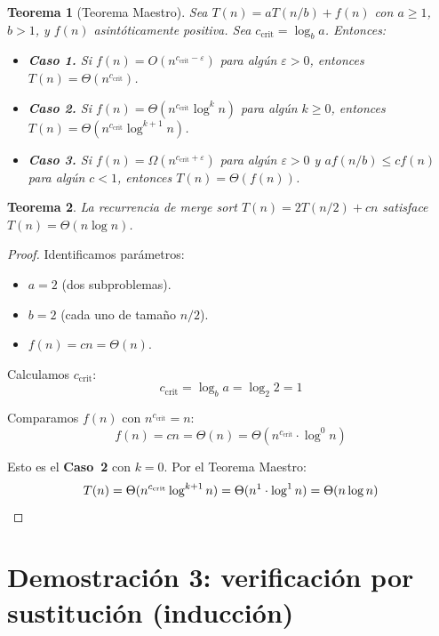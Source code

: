 \documentclass[11pt, letterpaper]{article}
\theoremstyle{definition}
\theoremstyle{plain}
\newtheorem{theorem}{Teorema}[section]
\theoremstyle{remark}
\begin{document}
\begin{theorem}[Teorema Maestro]\label{thm:master}
Sea $T(n) = aT(n/b) + f(n)$ con $a \geq 1$, $b > 1$, y $f(n)$
asintóticamente positiva. Sea $c_{\mathrm{crit}} = \log_b a$. Entonces:

\begin{itemize}
  \item \textbf{Caso 1.} Si
    $f(n) = O(n^{c_{\mathrm{crit}} - \varepsilon})$ para algún
    $\varepsilon > 0$, entonces
    $T(n) = \Theta(n^{c_{\mathrm{crit}}})$.
  \item \textbf{Caso 2.} Si
    $f(n) = \Theta(n^{c_{\mathrm{crit}}} \log^k n)$ para algún
    $k \geq 0$, entonces
    $T(n) = \Theta(n^{c_{\mathrm{crit}}} \log^{k+1} n)$.
  \item \textbf{Caso 3.} Si
    $f(n) = \Omega(n^{c_{\mathrm{crit}} + \varepsilon})$ para algún
    $\varepsilon > 0$ y $af(n/b) \leq cf(n)$ para algún $c < 1$,
    entonces $T(n) = \Theta(f(n))$.
\end{itemize}
\end{theorem}

\begin{theorem}\label{thm:master-app}
La recurrencia de merge sort $T(n) = 2T(n/2) + cn$ satisface
$T(n) = \Theta(n \log n)$.
\end{theorem}

\begin{proof}
Identificamos parámetros:
\begin{itemize}
  \item $a = 2$ (dos subproblemas).
  \item $b = 2$ (cada uno de tamaño $n/2$).
  \item $f(n) = cn = \Theta(n)$.
\end{itemize}

Calculamos $c_{\mathrm{crit}}$:
\[
  c_{\mathrm{crit}} = \log_b a = \log_2 2 = 1
\]

Comparamos $f(n)$ con $n^{c_{\mathrm{crit}}} = n$:
\[
  f(n) = cn = \Theta(n) = \Theta(n^{c_{\mathrm{crit}}} \cdot \log^0 n)
\]

Esto es el \textbf{Caso~2} con $k = 0$. Por el Teorema Maestro:
\[
  T(n) = \Theta(n^{c_{\mathrm{crit}}} \log^{k+1} n)
       = \Theta(n^1 \cdot \log^1 n)
       = \Theta(n \log n) \qedhere
\]
\end{proof}

\section{Demostración 3: verificación por sustitución (inducción)}
\end{document}

